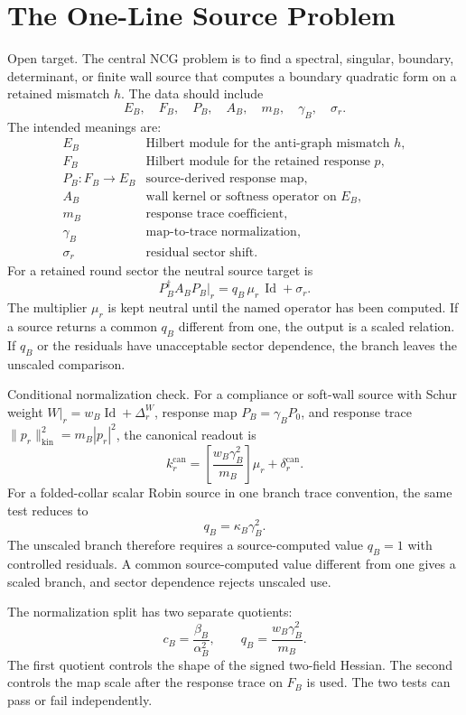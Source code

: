 \documentclass[11pt]{article}
\newcommand{\Id}{\operatorname{Id}}
\begin{document}
\section{The One-Line Source Problem}

Open target.  The central NCG problem is to find a spectral, singular,
boundary, determinant, or finite wall source that computes a boundary
quadratic form on a retained mismatch \(h\).  The data should include
\[
  E_B,\quad F_B,\quad P_B,\quad A_B,\quad m_B,\quad \gamma_B,\quad \sigma_r.
\]
The intended meanings are:
\[
\begin{array}{ll}
E_B & \text{Hilbert module for the anti-graph mismatch }h,\\
F_B & \text{Hilbert module for the retained response }p,\\
P_B:F_B\to E_B & \text{source-derived response map},\\
A_B & \text{wall kernel or softness operator on }E_B,\\
m_B & \text{response trace coefficient},\\
\gamma_B & \text{map-to-trace normalization},\\
\sigma_r & \text{residual sector shift}.
\end{array}
\]
For a retained round sector the neutral source target is
\[
  P_B^\dagger A_B P_B\big|_r
     =q_B\,\mu_r\,\Id+\sigma_r.
\]
The multiplier \(\mu_r\) is kept neutral until the named operator has been
computed.  If a source returns a common \(q_B\) different from one, the
output is a scaled relation.  If \(q_B\) or the residuals have unacceptable
sector dependence, the branch leaves the unscaled comparison.

Conditional normalization check.  For a compliance or soft-wall source with
Schur weight \(W|_r=w_B\Id+\Delta_r^W\), response map
\(P_B=\gamma_B P_0\), and response trace
\(\|p_r\|_{\mathrm{kin}}^2=m_B|p_r|^2\), the canonical readout is
\[
  k_r^{\mathrm{can}}
    =\left[\frac{w_B\gamma_B^2}{m_B}\right]\mu_r
      +\delta_r^{\mathrm{can}} .
\]
For a folded-collar scalar Robin source in one branch trace convention, the
same test reduces to
\[
  q_B=\kappa_B\gamma_B^2 .
\]
The unscaled branch therefore requires a source-computed value \(q_B=1\)
with controlled residuals.  A common source-computed value different from
one gives a scaled branch, and sector dependence rejects unscaled use.

The normalization split has two separate quotients:
\[
  c_B=\frac{\beta_B}{\alpha_B^2},
  \qquad
  q_B=\frac{w_B\gamma_B^2}{m_B}.
\]
The first quotient controls the shape of the signed two-field Hessian.  The
second controls the map scale after the response trace on \(F_B\) is used.
The two tests can pass or fail independently.
\end{document}
